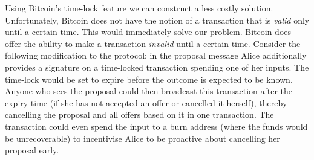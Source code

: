 \documentclass[runningheads]{llncs}
\begin{document}
Using Bitcoin's time-lock feature we can construct a less costly solution. Unfortunately, Bitcoin does not have the notion of a transaction that is \emph{valid} only until a certain time. This would immediately solve our problem. Bitcoin does offer the ability to make a transaction \emph{invalid} until a certain time. Consider the following modification to the protocol: in the proposal message Alice additionally provides a signature on a time-locked transaction spending one of her inputs. The time-lock would be set to expire before the outcome is expected to be known. Anyone who sees the proposal could then broadcast this transaction after the expiry time (if she has not accepted an offer or cancelled it herself), thereby cancelling the proposal and all offers based on it in one transaction. The transaction could even spend the input to a burn address (where the funds would be unrecoverable) to incentivise Alice to be proactive about cancelling her proposal early.

{}

\end{document}
